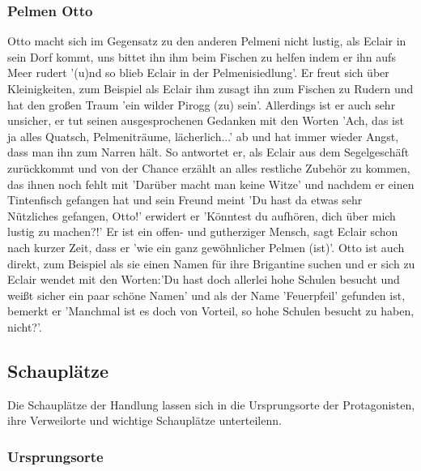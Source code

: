 \subsubsection{Pelmen Otto}
Otto macht sich im Gegensatz zu den anderen Pelmeni nicht lustig, als Eclair in sein Dorf kommt, \cite[S.43f]{pir} uns bittet ihn ihm beim Fischen zu helfen indem er ihn aufs Meer rudert \cite[S.44f]{pir} '(u)nd so blieb Eclair in der Pelmenisiedlung'.\cite[S.45]{pir} Er freut sich über Kleinigkeiten, zum Beispiel als Eclair ihm zusagt ihn zum Fischen zu Rudern \cite[S.45]{pir} und hat den großen Traum 'ein wilder Pirogg (zu) sein'.\cite[S.69]{pir} Allerdings ist er auch sehr unsicher,\cite[S.68]{pir} er tut seinen ausgesprochenen Gedanken mit den Worten 'Ach, das ist ja alles Quatsch, Pelmeniträume, lächerlich...' ab und hat immer wieder Angst, dass man ihn zum Narren hält. So antwortet er, als Eclair aus dem Segelgeschäft zurückkommt und von der Chance erzählt an alles restliche Zubehör zu kommen, das ihnen noch fehlt\cite[S.106]{pir} mit 'Darüber macht man keine Witze'\cite[S.107]{pir} und nachdem er einen Tintenfisch gefangen hat und sein Freund meint 'Du hast da etwas sehr Nützliches gefangen, Otto!'\cite[S.158]{pir} erwidert er 'Könntest du aufhören, dich über mich lustig zu machen?!'\cite[S.158]{pir}
Er ist ein offen- und gutherziger Mensch,\cite[S.68]{pir} sagt Eclair schon nach kurzer Zeit, dass er 'wie ein ganz gewöhnlicher Pelmen (ist)'.\cite[S.68]{pir} Otto ist auch direkt, zum Beispiel als sie einen Namen für ihre Brigantine suchen und er sich zu Eclair wendet mit den Worten:'Du hast doch allerlei hohe Schulen besucht und weißt sicher ein paar schöne Namen'\cite[S.90]{pir} und als der Name 'Feuerpfeil' gefunden ist, bemerkt er 'Manchmal ist es doch von Vorteil, so hohe Schulen besucht zu haben, nicht?'.\cite[S.93]{pir}


\subsection{Schauplätze}
Die Schauplätze der Handlung lassen sich in die Ursprungsorte der Protagonisten, ihre Verweilorte und wichtige Schauplätze unterteilenn.

\subsubsection{Ursprungsorte}

